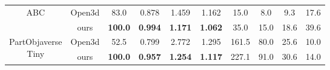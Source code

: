 \begin{table}[t]
\begin{tabular}{c|c|cccccccc}
 \multicolumn{1}{c|}{\multirow{2}[0]{*}{\parbox{1.5cm}{\centering ABC }}} & Open3d & 83.0  & 0.878 & 1.459 & 1.162 & 15.0  & 8.0   & 9.3   & 17.6 \\
          & ours  & \textbf{100.0} & \textbf{0.994} & \textbf{1.171} & \textbf{1.062} & 35.0  & 15.0  & 18.6  & 39.6 \\
    \midrule
 \multicolumn{1}{c|}{\multirow{2}[0]{*}{\parbox{1.5cm}{\centering PartObjaverse \\Tiny }}}  & Open3d & 52.5  & 0.799 & 2.772 & 1.295 & 161.5 & 80.0  & 25.6  & 10.0 \\
          & ours  & \textbf{100.0} & \textbf{0.957} & \textbf{1.254} & \textbf{1.117} & 227.1 & 91.0  & 30.6  & 14.0 \\
    \bottomrule
    \end{tabular}%
  \label{tab:Open3d}%
  \vspace{-1em}
\end{table}%

